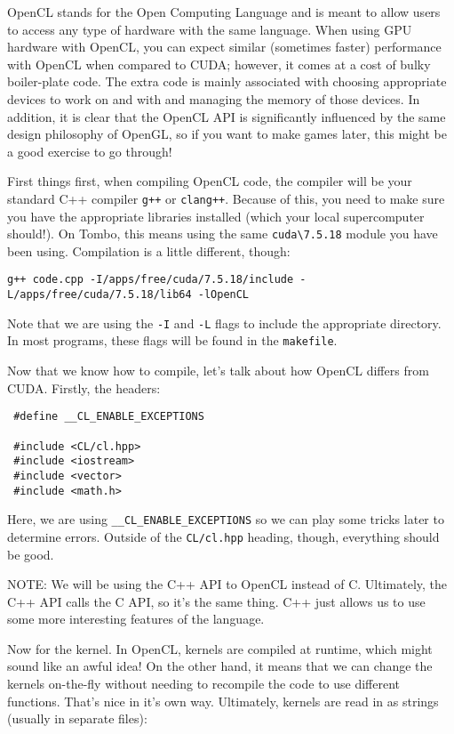 \documentclass[11pt]{article}
\begin{document}
OpenCL stands for the Open Computing Language and is meant to allow users to access any type of hardware with the same language. 
When using GPU hardware with OpenCL, you can expect similar (sometimes faster) performance with OpenCL when compared to CUDA; however, it comes at a cost of bulky boiler-plate code.
The extra code is mainly associated with choosing appropriate devices to work on and with and managing the memory of those devices.
In addition, it is clear that the OpenCL API is significantly influenced by the same design philosophy of OpenGL, so if you want to make games later, this might be a good exercise to go through!

First things first, when compiling OpenCL code, the compiler will be your standard C++ compiler \lstinline{g++} or \lstinline{clang++}. Because of this, you need to make sure you have the appropriate libraries installed (which your local supercomputer should!). On Tombo, this means using the same \lstinline{cuda\7.5.18} module you have been using. Compilation is a little different, though:

\begin{lstlisting}
g++ code.cpp -I/apps/free/cuda/7.5.18/include -L/apps/free/cuda/7.5.18/lib64 -lOpenCL
\end{lstlisting}

Note that we are using the \lstinline{-I} and \lstinline{-L} flags to include the appropriate directory. In most programs, these flags will be found in the \lstinline{makefile}.

Now that we know how to compile, let's talk about how OpenCL differs from CUDA. Firstly, the headers:

\begin{lstlisting}
 #define __CL_ENABLE_EXCEPTIONS

 #include <CL/cl.hpp>
 #include <iostream>
 #include <vector>
 #include <math.h>

\end{lstlisting}

Here, we are using \lstinline{__CL_ENABLE_EXCEPTIONS} so we can play some tricks later to determine errors. Outside of the \lstinline{CL/cl.hpp} heading, though, everything should be good.

NOTE: We will be using the C++ API to OpenCL instead of C. Ultimately, the C++ API calls the C API, so it's the same thing. C++ just allows us to use some more interesting features of the language.

Now for the kernel. In OpenCL, kernels are compiled at runtime, which might sound like an awful idea! On the other hand, it means that we can change the kernels on-the-fly without needing to recompile the code to use different functions. That's nice in it's own way. Ultimately, kernels are read in as strings (usually in separate files):
\end{document}
